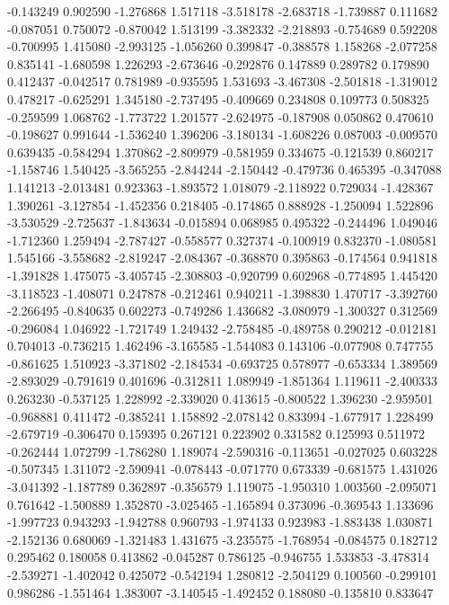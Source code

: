 -0.143249
0.902590
-1.276868
1.517118
-3.518178
-2.683718
-1.739887
0.111682
-0.087051
0.750072
-0.870042
1.513199
-3.382332
-2.218893
-0.754689
0.592208
-0.700995
1.415080
-2.993125
-1.056260
0.399847
-0.388578
1.158268
-2.077258
0.835141
-1.680598
1.226293
-2.673646
-0.292876
0.147889
0.289782
0.179890
0.412437
-0.042517
0.781989
-0.935595
1.531693
-3.467308
-2.501818
-1.319012
0.478217
-0.625291
1.345180
-2.737495
-0.409669
0.234808
0.109773
0.508325
-0.259599
1.068762
-1.773722
1.201577
-2.624975
-0.187908
0.050862
0.470610
-0.198627
0.991644
-1.536240
1.396206
-3.180134
-1.608226
0.087003
-0.009570
0.639435
-0.584294
1.370862
-2.809979
-0.581959
0.334675
-0.121539
0.860217
-1.158746
1.540425
-3.565255
-2.844244
-2.150442
-0.479736
0.465395
-0.347088
1.141213
-2.013481
0.923363
-1.893572
1.018079
-2.118922
0.729034
-1.428367
1.390261
-3.127854
-1.452356
0.218405
-0.174865
0.888928
-1.250094
1.522896
-3.530529
-2.725637
-1.843634
-0.015894
0.068985
0.495322
-0.244496
1.049046
-1.712360
1.259494
-2.787427
-0.558577
0.327374
-0.100919
0.832370
-1.080581
1.545166
-3.558682
-2.819247
-2.084367
-0.368870
0.395863
-0.174564
0.941818
-1.391828
1.475075
-3.405745
-2.308803
-0.920799
0.602968
-0.774895
1.445420
-3.118523
-1.408071
0.247878
-0.212461
0.940211
-1.398830
1.470717
-3.392760
-2.266495
-0.840635
0.602273
-0.749286
1.436682
-3.080979
-1.300327
0.312569
-0.296084
1.046922
-1.721749
1.249432
-2.758485
-0.489758
0.290212
-0.012181
0.704013
-0.736215
1.462496
-3.165585
-1.544083
0.143106
-0.077908
0.747755
-0.861625
1.510923
-3.371802
-2.184534
-0.693725
0.578977
-0.653334
1.389569
-2.893029
-0.791619
0.401696
-0.312811
1.089949
-1.851364
1.119611
-2.400333
0.263230
-0.537125
1.228992
-2.339020
0.413615
-0.800522
1.396230
-2.959501
-0.968881
0.411472
-0.385241
1.158892
-2.078142
0.833994
-1.677917
1.228499
-2.679719
-0.306470
0.159395
0.267121
0.223902
0.331582
0.125993
0.511972
-0.262444
1.072799
-1.786280
1.189074
-2.590316
-0.113651
-0.027025
0.603228
-0.507345
1.311072
-2.590941
-0.078443
-0.071770
0.673339
-0.681575
1.431026
-3.041392
-1.187789
0.362897
-0.356579
1.119075
-1.950310
1.003560
-2.095071
0.761642
-1.500889
1.352870
-3.025465
-1.165894
0.373096
-0.369543
1.133696
-1.997723
0.943293
-1.942788
0.960793
-1.974133
0.923983
-1.883438
1.030871
-2.152136
0.680069
-1.321483
1.431675
-3.235575
-1.768954
-0.084575
0.182712
0.295462
0.180058
0.413862
-0.045287
0.786125
-0.946755
1.533853
-3.478314
-2.539271
-1.402042
0.425072
-0.542194
1.280812
-2.504129
0.100560
-0.299101
0.986286
-1.551464
1.383007
-3.140545
-1.492452
0.188080
-0.135810
0.833647

